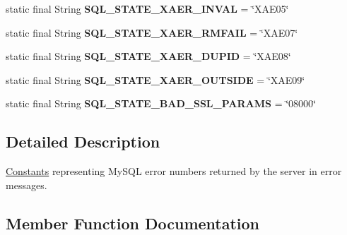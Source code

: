 \begin{DoxyCompactItemize}
\item 
\mbox{\label{classcom_1_1mysql_1_1cj_1_1exceptions_1_1_mysql_error_numbers_adc64672df647905aa814642c03368667}} 
static final String {\bfseries S\+Q\+L\+\_\+\+S\+T\+A\+T\+E\+\_\+\+X\+A\+E\+R\+\_\+\+I\+N\+V\+AL} = \char`\"{}X\+A\+E05\char`\"{}
\item 
\mbox{\label{classcom_1_1mysql_1_1cj_1_1exceptions_1_1_mysql_error_numbers_a5da67e5d5b6c5cd2090d2c9368137435}} 
static final String {\bfseries S\+Q\+L\+\_\+\+S\+T\+A\+T\+E\+\_\+\+X\+A\+E\+R\+\_\+\+R\+M\+F\+A\+IL} = \char`\"{}X\+A\+E07\char`\"{}
\item 
\mbox{\label{classcom_1_1mysql_1_1cj_1_1exceptions_1_1_mysql_error_numbers_a20b15c928041322c2302945106060b15}} 
static final String {\bfseries S\+Q\+L\+\_\+\+S\+T\+A\+T\+E\+\_\+\+X\+A\+E\+R\+\_\+\+D\+U\+P\+ID} = \char`\"{}X\+A\+E08\char`\"{}
\item 
\mbox{\label{classcom_1_1mysql_1_1cj_1_1exceptions_1_1_mysql_error_numbers_a5c76f47ead2b6fe4c75812f6888dd3c1}} 
static final String {\bfseries S\+Q\+L\+\_\+\+S\+T\+A\+T\+E\+\_\+\+X\+A\+E\+R\+\_\+\+O\+U\+T\+S\+I\+DE} = \char`\"{}X\+A\+E09\char`\"{}
\item 
\mbox{\label{classcom_1_1mysql_1_1cj_1_1exceptions_1_1_mysql_error_numbers_a20af95af276742896c60976370d8acf5}} 
static final String {\bfseries S\+Q\+L\+\_\+\+S\+T\+A\+T\+E\+\_\+\+B\+A\+D\+\_\+\+S\+S\+L\+\_\+\+P\+A\+R\+A\+MS} = \char`\"{}08000\char`\"{}
\end{DoxyCompactItemize}


\subsection{Detailed Description}
\mbox{\hyperlink{classcom_1_1mysql_1_1cj_1_1_constants}{Constants}} representing My\+S\+QL error numbers returned by the server in error messages. 

\subsection{Member Function Documentation}
\mbox{\label{classcom_1_1mysql_1_1cj_1_1exceptions_1_1_mysql_error_numbers_ad2b67380d5de823e5596826679ba55bc}} 
